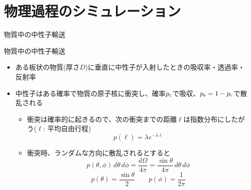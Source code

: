 \section{物理過程のシミュレーション}

\begin{frame}[t,fragile]{物質中の中性子輸送}
  \begin{center}
  \end{center}
\end{frame}

\begin{frame}[t,fragile]{物質中の中性子輸送}
  \begin{itemize}
  \item ある板状の物質(厚さ$D$)に垂直に中性子が入射したときの吸収率・透過率・反射率
  \item 中性子はある確率で物質の原子核に衝突し、確率$p_{\rm c}$で吸収、$p_{\rm s}=1-p_{\rm c}$で散乱される
    \begin{itemize}
    \item 衝突は確率的に起きるので、次の衝突までの距離$\ell$は指数分布にしたがう($\ell$: 平均自由行程)
      \[
      p(\ell) = \lambda e^{-\lambda\ell}
      \]
    \item 衝突時、ランダムな方向に散乱されるとすると
      \[
      p(\theta,\phi) \, d\theta \, d\phi = \frac{d\Omega}{4\pi} = \frac{\sin \theta}{4\pi} \, d\theta \, d\phi
      \]
      \[
      p(\theta) = \frac{\sin \theta}{2} \qquad p(\phi)=\frac{1}{2\pi}
      \]
    \end{itemize}
  \end{itemize}
\end{frame}

